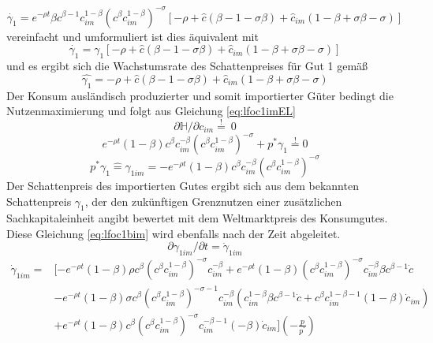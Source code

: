 \begin{equation}
\dot{\gamma_1}=e^{-\rho t}\beta c^{\beta-1}c_{im}^{1-\beta}(c^\beta c_{im}^{1-\beta})^{-\sigma}[-\rho+\hat{c}(\beta-1-\sigma\beta)+\hat{c}_{im}(1-\beta+\sigma\beta-\sigma)]\label{eq:lfoc1cEL}
\end{equation}
vereinfacht und umformuliert ist dies äquivalent mit
\begin{equation*}
\dot{\gamma_1}=\gamma_1[-\rho+\hat{c}(\beta-1-\sigma\beta)+\hat{c}_{im}(1-\beta+\sigma\beta-\sigma)]\label{eq:foc1cEL}
\end{equation*}
und es ergibt sich die Wachstumsrate des Schattenpreises für Gut 1 gemä{\ss} 
\begin{equation}
\hat{\gamma_1}=-\rho+\hat{c}(\beta-1-\sigma\beta)+\hat{c}_{im}(1-\beta+\sigma\beta-\sigma)\label{eq:foc1dEL}
\end{equation}
Der Konsum ausländisch produzierter und somit importierter Güter bedingt die Nutzenmaximierung und folgt aus Gleichung \eqref{eq:lfoc1imEL} \\
\begin{equation*}
\partial\mathbb{H}/\partial c_{im}\overset{!}{=}~0
\end{equation*}
\begin{equation}
e^{-\rho t}(1-\beta)c^\beta c_{im}^{-\beta}(c^\beta c_{im}^{1-\beta})^{-\sigma}+p^*\gamma_{1}\overset{!}{=}0\label{eq:lfoc1aim}
\end{equation}
\vspace{-0.7cm}
\begin{equation}
p^*\gamma_{1}\hat{=} \gamma_{1im}=-e^{-\rho t}(1-\beta) c^{\beta}c_{im}^{-\beta}(c^\beta c_{im}^{1-\beta})^{-\sigma}\label{eq:lfoc1bim}\end{equation}
Der Schattenpreis des importierten Gutes ergibt sich aus dem bekannten Schattenpreis $\gamma_1$, der den zukünftigen Grenznutzen einer zusätzlichen Sachkapitaleinheit angibt bewertet mit dem Weltmarktpreis des Konsumgutes. Diese Gleichung \eqref{eq:lfoc1bim} wird ebenfalls nach der Zeit abgeleitet.
\begin{equation}\partial\gamma_{1im}/\partial t=\dot{\gamma}_{1im}\end{equation}
\begin{equation*}
\begin{split}
\dot{\gamma}_{1im} = &[- e^{- \rho t} (1- \beta) \rho c^{ \beta} ( c^{ \beta} c_{im}^{1- \beta})^{- \sigma} c_{im}^{- \beta} + e^{ - \rho t} (1- \beta)(c^{ \beta} c_{im}^{1- \beta})^{- \sigma} c_{im}^{-\beta} \beta c^{ \beta - 1} \dot{c}\\
& - e^{- \rho t} (1 - \beta) \sigma c^{ \beta} (c^{ \beta} c_{im}^{1- \beta})^{- \sigma - 1} c_{im}^{- \beta}(c_{im}^{1- \beta} \beta c^{ \beta -1} \dot{c} + c^{ \beta} c_{im}^{1- \beta -1} (1- \beta) \dot{c}_{im}) \\
& + e^{- \rho t} (1- \beta) c^{ \beta} ( c^{ \beta} c_{im}^{1- \beta})^{- \sigma} c_{im}^{- \beta -1}(- \beta) \dot{c}_{im} ] (-\frac{p}{p^{^*}})
\end{split}
\end{equation*}
